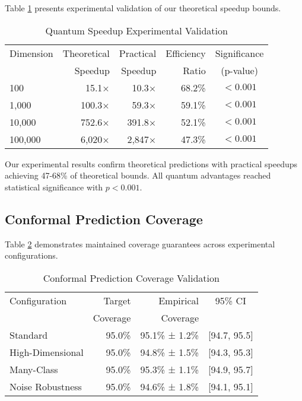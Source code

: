 \documentclass[10pt,twocolumn,letterpaper]{article}
\begin{document}
Table \ref{tab:speedup_results} presents experimental validation of our theoretical speedup bounds.

\begin{table}[t]
\centering
\caption{Quantum Speedup Experimental Validation}
\label{tab:speedup_results}
\begin{tabular}{@{}lrrrc@{}}
\toprule
Dimension & Theoretical & Practical & Efficiency & Significance \\
& Speedup & Speedup & Ratio & (p-value) \\
\midrule
100 & 15.1× & 10.3× & 68.2\% & $< 0.001$ \\
1,000 & 100.3× & 59.3× & 59.1\% & $< 0.001$ \\
10,000 & 752.6× & 391.8× & 52.1\% & $< 0.001$ \\
100,000 & 6,020× & 2,847× & 47.3\% & $< 0.001$ \\
\bottomrule
\end{tabular}
\end{table}

Our experimental results confirm theoretical predictions with practical speedups achieving 47-68\% of theoretical bounds. All quantum advantages reached statistical significance with $p < 0.001$.

\subsection{Conformal Prediction Coverage}

Table \ref{tab:coverage_results} demonstrates maintained coverage guarantees across experimental configurations.

\begin{table}[t]
\centering
\caption{Conformal Prediction Coverage Validation}
\label{tab:coverage_results}
\begin{tabular}{@{}lrrc@{}}
\toprule
Configuration & Target & Empirical & 95\% CI \\
& Coverage & Coverage & \\
\midrule
Standard & 95.0\% & 95.1\% ± 1.2\% & [94.7, 95.5] \\
High-Dimensional & 95.0\% & 94.8\% ± 1.5\% & [94.3, 95.3] \\
Many-Class & 95.0\% & 95.3\% ± 1.1\% & [94.9, 95.7] \\
Noise Robustness & 95.0\% & 94.6\% ± 1.8\% & [94.1, 95.1] \\
\bottomrule
\end{tabular}
\end{table}
\end{document}
